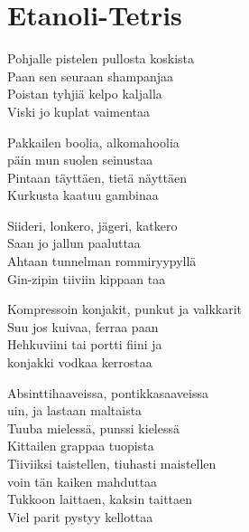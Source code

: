 \section{Etanoli-Tetris}

Pohjalle pistelen pullosta koskista\\
Paan sen seuraan shampanjaa\\
Poistan tyhjiä kelpo kaljalla\\
Viski jo kuplat vaimentaa

Pakkailen boolia, alkomahoolia\\
päin mun suolen seinustaa\\
Pintaan täyttäen, tietä näyttäen\\
Kurkusta kaatuu gambinaa

Siideri, lonkero, jägeri, katkero\\
Saan jo jallun paaluttaa\\
Ahtaan tunnelman rommiryypyllä\\
Gin-zipin tiiviin kippaan taa

Kompressoin konjakit, punkut ja valkkarit\\
Suu jos kuivaa, ferraa paan\\
Hehkuviini tai portti fiini ja \\
konjakki vodkaa kerrostaa

Absinttihaaveissa, pontikkasaaveissa\\
uin, ja lastaan maltaista\\
Tuuba mielessä, punssi kielessä\\
Kittailen grappaa tuopista\\

Tiiviiksi taistellen, tiuhasti maistellen\\
voin tän kaiken mahduttaa\\
Tukkoon laittaen, kaksin taittaen\\
Viel parit pystyy kellottaa